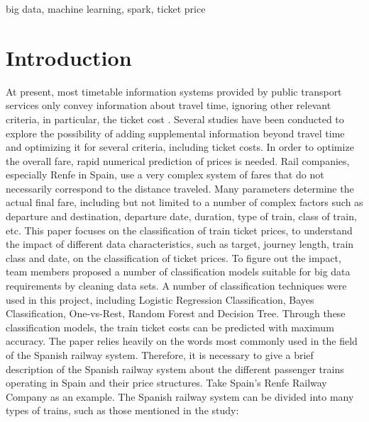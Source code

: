 \documentclass[conference]{IEEEtran}
\begin{document}
\begin{IEEEkeywords}
big data, machine learning, spark, ticket price
\end{IEEEkeywords}

\section{Introduction}
At present, most timetable information systems provided by public transport services only convey information about travel time, ignoring other relevant criteria, in particular, the ticket cost \cite{b1}. Several studies have been conducted to explore the possibility of adding supplemental information beyond travel time and optimizing it for several criteria, including ticket costs. In order to optimize the overall fare, rapid numerical prediction of prices is needed. Rail companies, especially Renfe in Spain, use a very complex system of fares that do not necessarily correspond to the distance traveled. Many parameters determine the actual final fare, including but not limited to a number of complex factors such as departure and destination, departure date, duration, type of train, class of train, etc.
This paper focuses on the classification of train ticket prices, to understand the impact of different data characteristics, such as target, journey length, train class and date, on the classification of ticket prices. To figure out the impact, team members proposed a number of classification models suitable for big data requirements by cleaning data sets. A number of classification techniques were used in this project, including Logistic Regression Classification, Bayes Classification, One-vs-Rest, Random Forest and Decision Tree. Through these classification models, the train ticket costs can be predicted with maximum accuracy.
The paper relies heavily on the words most commonly used in the field of the Spanish railway system. Therefore, it is necessary to give a brief description of the Spanish railway system about the different passenger trains operating in Spain and their price structures. Take Spain's Renfe Railway Company as an example. The Spanish railway system can be divided into many types of trains, such as those mentioned in the study:
\end{document}
